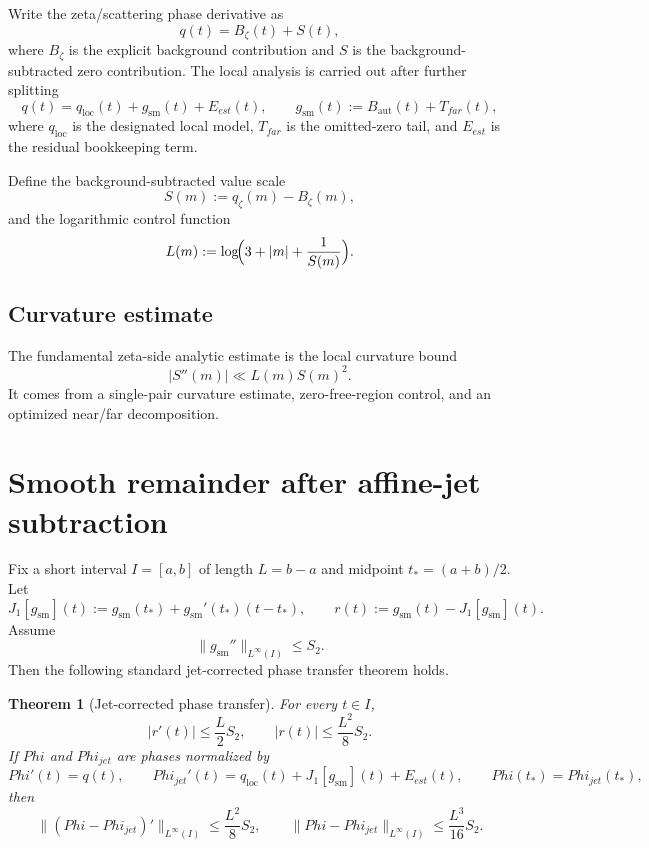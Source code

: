 \documentclass[11pt,a4paper]{amsart}
\def\Phi{Phi}%
\def\jet{jet}%
\def\far{far}%
\def\est{est}%
\theoremstyle{plain}
\newtheorem{theorem}{Theorem}[section]
\theoremstyle{definition}
\newcommand{\Ph}{\Phi}
\newcommand{\Aut}{\mathrm{aut}}
\newcommand{\loc}{\mathrm{loc}}
\newcommand{\sm}{\mathrm{sm}}
\newcommand{\far}{\mathrm{far}}
\newcommand{\est}{\mathrm{est}}
\newcommand{\jet}{\mathrm{jet}}
\begin{document}
Write the zeta/scattering phase derivative as
\begin{equation}\label{eq:q-split}
q(t)=B_\zeta(t)+S(t),
\end{equation}
where $B_\zeta$ is the explicit background contribution and $S$ is the background-subtracted zero contribution. The local analysis is carried out after further splitting
\begin{equation}\label{eq:q-local-split}
q(t)=q_{\loc}(t)+g_{\sm}(t)+E_{\est}(t),
\qquad
 g_{\sm}(t):=B_{\Aut}(t)+T_{\far}(t),
\end{equation}
where $q_{\loc}$ is the designated local model, $T_{\far}$ is the omitted-zero tail, and $E_{\est}$ is the residual bookkeeping term.

Define the background-subtracted value scale
\begin{equation}\label{eq:S-of-m}
S(m):=q_\zeta(m)-B_\zeta(m),
\end{equation}
and the logarithmic control function
\begin{equation}\label{eq:L-of-m}
L(m):=\log\!\Bigl(3+|m|+\frac1{S(m)}\Bigr).
\end{equation}

\subsection{Curvature estimate}

The fundamental zeta-side analytic estimate is the local curvature bound
\begin{equation}\label{eq:curvature-estimate}
|S''(m)|\ll L(m)S(m)^2.
\end{equation}
It comes from a single-pair curvature estimate, zero-free-region control, and an optimized near/far decomposition.

\section{Smooth remainder after affine-jet subtraction}

Fix a short interval $I=[a,b]$ of length $L=b-a$ and midpoint $t_*=(a+b)/2$. Let
\[
J_1[g_{\sm}](t):=g_{\sm}(t_*)+g_{\sm}'(t_*)(t-t_*),
\qquad
r(t):=g_{\sm}(t)-J_1[g_{\sm}](t).
\]
Assume
\[
\|g_{\sm}''\|_{L^\infty(I)}\le S_2.
\]
Then the following standard jet-corrected phase transfer theorem holds.

\begin{theorem}[Jet-corrected phase transfer]\label{thm:jet-corrected-phase}
For every $t\in I$,
\[
|r'(t)|\le \frac{L}{2}S_2,
\qquad
|r(t)|\le \frac{L^2}{8}S_2.
\]
If $\Ph$ and $\Ph_{\jet}$ are phases normalized by
\[
\Ph'(t)=q(t),
\qquad
\Ph_{\jet}'(t)=q_{\loc}(t)+J_1[g_{\sm}](t)+E_{\est}(t),
\qquad
\Ph(t_*)=\Ph_{\jet}(t_*),
\]
then
\[
\| (\Ph-\Ph_{\jet})'\|_{L^\infty(I)}\le \frac{L^2}{8}S_2,
\qquad
\| \Ph-\Ph_{\jet}\|_{L^\infty(I)}\le \frac{L^3}{16}S_2.
\]
\end{theorem}
\end{document}
